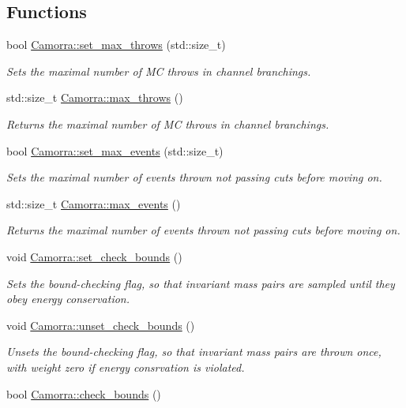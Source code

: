 \subsection*{Functions}
\begin{DoxyCompactItemize}
\item 
bool \hyperlink{a00829_a8e7abe7989872893e4658e836e705e8b}{Camorra::set\_\-max\_\-throws} (std::size\_\-t)
\begin{DoxyCompactList}\small\item\em Sets the maximal number of MC throws in channel branchings. \end{DoxyCompactList}\item 
\hypertarget{a00829_aad740b9c1b63bae05bde19fba7346083}{
std::size\_\-t \hyperlink{a00829_aad740b9c1b63bae05bde19fba7346083}{Camorra::max\_\-throws} ()}
\label{a00829_aad740b9c1b63bae05bde19fba7346083}

\begin{DoxyCompactList}\small\item\em Returns the maximal number of MC throws in channel branchings. \end{DoxyCompactList}\item 
bool \hyperlink{a00829_ae3b4057dc8cfd9c13e27baeb41fe2811}{Camorra::set\_\-max\_\-events} (std::size\_\-t)
\begin{DoxyCompactList}\small\item\em Sets the maximal number of events thrown not passing cuts before moving on. \end{DoxyCompactList}\item 
std::size\_\-t \hyperlink{a00829_a40ee4ceb5138dc297571023bd1a5914e}{Camorra::max\_\-events} ()
\begin{DoxyCompactList}\small\item\em Returns the maximal number of events thrown not passing cuts before moving on. \end{DoxyCompactList}\item 
void \hyperlink{a00829_ae5c24849230108835931bb0c65d46c71}{Camorra::set\_\-check\_\-bounds} ()
\begin{DoxyCompactList}\small\item\em Sets the bound-\/checking flag, so that invariant mass pairs are sampled until they obey energy conservation. \end{DoxyCompactList}\item 
void \hyperlink{a00829_a7b0e83f06ef665b4c5f83b491082d880}{Camorra::unset\_\-check\_\-bounds} ()
\begin{DoxyCompactList}\small\item\em Unsets the bound-\/checking flag, so that invariant mass pairs are thrown once, with weight zero if energy consrvation is violated. \end{DoxyCompactList}\item 
\hypertarget{a00829_a8a8aa03dda7935c5af2720097cdbc010}{
bool \hyperlink{a00829_a8a8aa03dda7935c5af2720097cdbc010}{Camorra::check\_\-bounds} ()}
\label{a00829_a8a8aa03dda7935c5af2720097cdbc010}


\end{DoxyCompactItemize}
